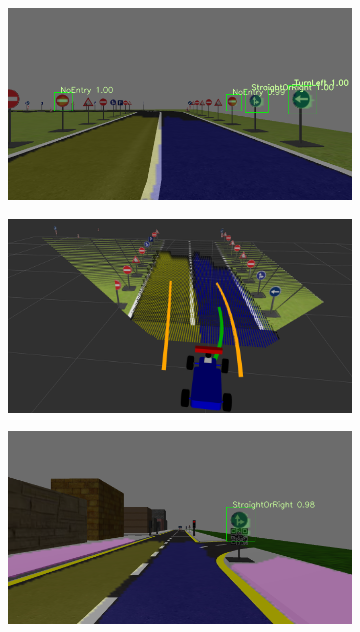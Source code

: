 \begin{figure}[h]
  \centering
  \begin{subfigure}[b]{0.45\linewidth}
    \includegraphics[width=\linewidth]{figures/experiments/lane-following-img.png}
  \end{subfigure}
  \begin{subfigure}[b]{0.45\linewidth}
    \includegraphics[width=\linewidth]{figures/experiments/lane-following-pc.png}
  \end{subfigure}
  \begin{subfigure}[b]{0.45\linewidth}
    \includegraphics[width=\linewidth]{figures/experiments/straight-or-right-img.png}

\end{subfigure}
\end{figure}
